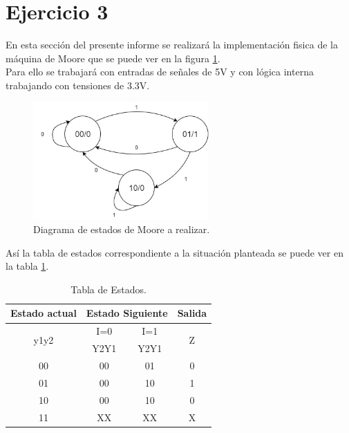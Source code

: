 \section{Ejercicio 3}
En esta sección del presente informe se realizará la implementación fisica de la máquina de Moore que se puede ver en la figura \ref{ej3_diagrama_de_estados}.\\
Para ello se trabajará con entradas de señales de 5V y con lógica interna trabajando con tensiones de 3.3V.
\begin{figure}[H]
    \centering
    \includegraphics[width=0.6\textwidth]{figs/Ej3/FSM.jpg} %
    \caption{Diagrama de estados de Moore a realizar.}
    \label{ej3_diagrama_de_estados}
\end{figure}
%
Así la tabla de estados correspondiente a la situación planteada se puede ver en la tabla \ref{ej3_table1}.
\begin{table}[H]
\caption{Tabla de Estados.}
\label{ej3_table1}
\centering
\begin{tabular}{|c|c|c|c|}
\hline
Estado actual         & \multicolumn{2}{c|}{Estado Siguiente} & Salida             \\ \hline
\multirow{2}{*}{y1y2} & I=0               & I=1               & \multirow{2}{*}{Z} \\ \cline{2-3}
                      & Y2Y1              & Y2Y1              &                    \\ \hline
00                    & 00                & 01                & 0                  \\ \hline
01                    & 00                & 10                & 1                  \\ \hline
10                    & 00                & 10                & 0                  \\ \hline
11                    & XX                & XX                & X                  \\ \hline
\end{tabular}
\end{table}
